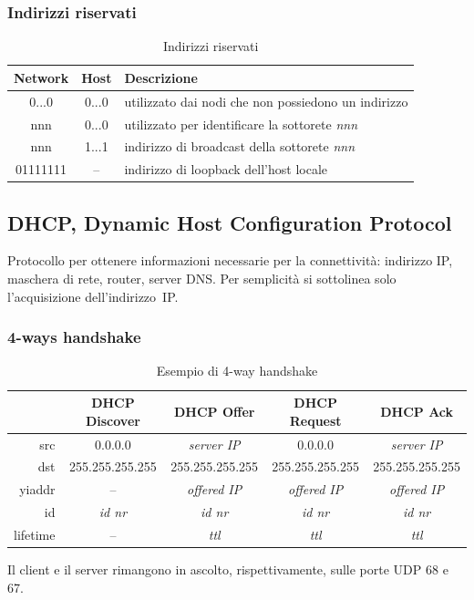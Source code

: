 \documentclass[12pt,a4paper]{article}
\begin{document}
\subsubsection{Indirizzi riservati}
\begin{table}[H]
\centering
\begin{tabular}{ c | c | l}
  Network   & Host  & Descrizione \\ \hline
  0...0     & 0...0 & utilizzato dai nodi che non possiedono un indirizzo \\
  nnn       & 0...0 & utilizzato per identificare la sottorete \emph{nnn} \\
  nnn       & 1...1 & indirizzo di broadcast della sottorete \emph{nnn}   \\
  01111111  & --    & indirizzo di loopback dell'host locale              \\
\end{tabular}
\caption{Indirizzi riservati}
\end{table}

\subsection{DHCP, Dynamic Host Configuration Protocol}
Protocollo per ottenere informazioni necessarie per la connettività:
indirizzo IP, maschera di rete, router, server DNS.
Per semplicità si sottolinea solo l'acquisizione dell'indirizzo~IP.

\subsubsection{4-ways handshake}
\begin{table}[H]
\begin{tabular}{r | c | c | c | c |}\hline
          & DHCP Discover   & DHCP Offer          & DHCP Request        & DHCP Ack            \\ \hline
src       & 0.0.0.0         & \textit{server IP}  & 0.0.0.0             & \textit{server IP}  \\
dst       & 255.255.255.255 & 255.255.255.255     & 255.255.255.255     & 255.255.255.255     \\
yiaddr    & --              & \textit{offered IP} & \textit{offered IP} & \textit{offered IP} \\
id        & \textit{id nr}  & \textit{id nr}      & \textit{id nr}      & \textit{id nr}      \\
lifetime  & --              & \textit{ttl}        & \textit{ttl}        & \textit{ttl}
\end{tabular}
\caption{Esempio di 4-way handshake}
\end{table}
Il client e il server rimangono in ascolto, rispettivamente, sulle porte UDP 68 e 67.
\end{document}
